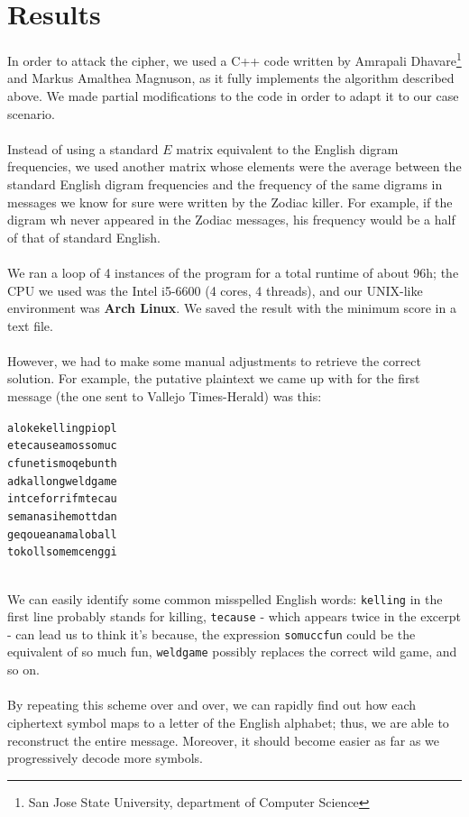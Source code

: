 \documentclass[Lau,binding=0.6cm,oneside]{sapthesis}
\begin{document}
\section{Results}
In order to attack the cipher, we used a C++ code\supercite{homophonicattackcode} written by Amrapali Dhavare\footnote[1]{San Jose State University, department of Computer Science} and Markus Amalthea Magnuson, as it fully implements the algorithm described above. We made partial modifications to the code in order to adapt it to our case scenario.\\\\
Instead of using a standard $E$ matrix equivalent to the English digram frequencies, we used another matrix whose elements were the average between the standard English digram frequencies and the frequency of the same digrams in messages we know for sure were written by the Zodiac killer. For example, if the digram \textsf{wh} never appeared in the Zodiac messages, his frequency would be a half of that of standard English.\\\\
We ran a loop of 4 instances of the program for a total runtime of about 96h; the CPU we used was the \textsf{Intel i5-6600} (4 cores, 4 threads), and our UNIX-like environment was \textbf{Arch Linux}. We saved the result with the minimum score in a text file.\\\\
However, we had to make some manual adjustments to retrieve the correct solution. For example, the putative plaintext we came up with for the first message (the one sent to Vallejo Times-Herald) was this:\\

\begin{displayquote}\texttt{alokekellingpiopl\\
etecauseamossomuc\\
cfunetismoqebunth\\
adkallongweldgame\\
intceforrifmtecau\\
semanasihemottdan\\
geqoueanamaloball\\
tokollsomemcenggi\\
}
\end{displayquote}
\ \\
We can easily identify some common misspelled English words: \texttt{kelling} in the first line probably stands for \textsf{killing}, \texttt{tecause} - which appears twice in the excerpt - can lead us to think it's \textsf{because}, the expression \texttt{somuccfun} could be the equivalent of \textsf{so much fun}, \texttt{weldgame} possibly replaces the correct \textsf{wild game}, and so on.\\\\
By repeating this scheme over and over, we can rapidly find out how each ciphertext symbol maps to a letter of the English alphabet; thus, we are able to reconstruct the entire message. Moreover, it should become easier as far as we progressively decode more symbols.\\
\end{document}
